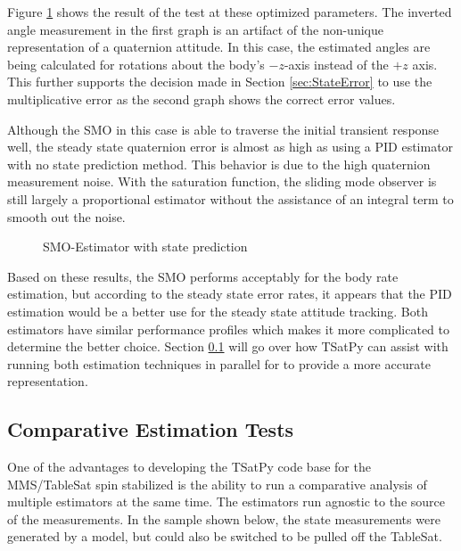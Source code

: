 Figure \ref{fig:SMOEstimatorwithstateprediction} shows the result of the test at these optimized parameters.  The inverted angle measurement in the first graph is an artifact of the non-unique representation of a quaternion attitude.  In this case, the estimated angles are being calculated for rotations about the body's $-z$-axis instead of the $+z$ axis.  This further supports the decision made in Section \ref{sec:StateError} to use the multiplicative error as the second graph shows the correct error values.

Although the SMO in this case is able to traverse the initial transient response well, the steady state quaternion error is almost as high as using a PID estimator with no state prediction method.  This behavior is due to the high quaternion measurement noise.  With the saturation function, the sliding mode observer is still largely a proportional estimator without the assistance of an integral term to smooth out the noise.

\begin{figure}[H]
  \centerline{}
  \caption{SMO-Estimator with state prediction}
  \label{fig:SMOEstimatorwithstateprediction}
\end{figure}

Based on these results, the SMO performs acceptably for the body rate estimation, but according to the steady state error rates, it appears that the PID estimation would be a better use for the steady state attitude tracking.  Both estimators have similar performance profiles which makes it more complicated to determine the better choice.  Section \ref{subsec:ComparativeEstimationTests} will go over how TSatPy can assist with running both estimation techniques in parallel for to provide a more accurate representation.

\subsection{Comparative Estimation Tests}
\label{subsec:ComparativeEstimationTests}

One of the advantages to developing the TSatPy code base for the MMS/TableSat spin stabilized is the ability to run a comparative analysis of multiple estimators at the same time.  The estimators run agnostic to the source of the measurements.  In the sample shown below, the state measurements were generated by a model, but could also be switched to be pulled off the TableSat.

